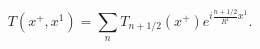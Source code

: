 \begin{equation}
 T ( x^+, x^1) = \sum_n T_{n+1/2} (x^+) e^{i \frac{n+1/2}{R^1} x^1} .
\end{equation}

